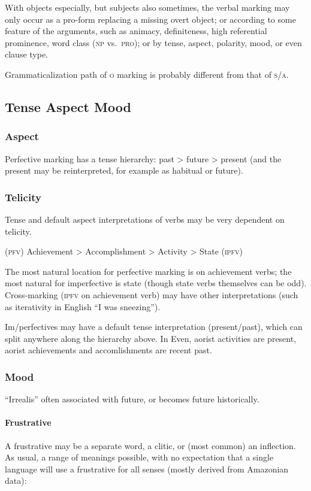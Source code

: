\documentclass[11pt]{article}
\newcommand{\I}[1]{\textsc{#1}}   %
\begin{document}
With objects especially, but subjects also sometimes, the verbal
marking may only occur as a pro-form replacing a missing overt object;
or according to some feature of the arguments, such as animacy,
definiteness, high referential prominence, word class (\I{np}
vs.\ \I{pro}); or by tense, aspect, polarity, mood, or even clause
type.

Grammaticalization path of \I{o} marking is probably different from
that of \I{s/a}.


\subsection{Tense Aspect Mood}

\subsubsection{Aspect} Perfective marking has a tense hierarchy: past
> future > present (and the present may be reinterpreted, for example
as habitual or future).

\subsubsection{Telicity}
Tense and default aspect interpretations of verbs may be very
dependent on telicity.
\begin{center}
  \I{(pfv)} Achievement > Accomplishment > Activity > State \I{(ipfv)}
\end{center}
\noindent The most natural location for perfective marking is on
achievement verbs; the most natural for imperfective is state (though
state verbs themselves can be odd).  Cross-marking (\I{ipfv} on
achievement verb) may have other interpretations (such as iterativity
in English ``I was sneezing'').

Im/perfectives may have a default tense interpretation (present/past),
which can split anywhere along the hierarchy above.  In Even, aorist
activities are present, aorist achievements and accomlishments are
recent past.

\subsubsection{Mood}
``Irrealis'' often associated with future, or becomes future
historically. 

\paragraph{Frustrative}
A frustrative may be a separate word, a clitic, or (most common) an
inflection.  As usual, a range of meanings possible, with no
expectation that a single language will use a frustrative for all
senses (mostly derived from Amazonian data):
\end{document}
